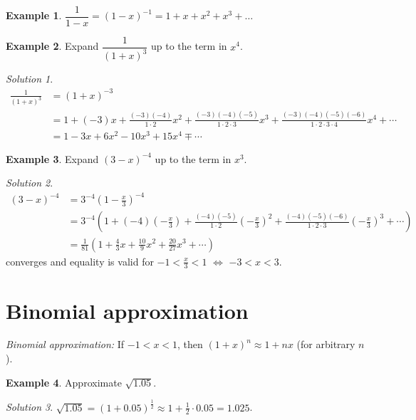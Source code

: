 \documentclass[
  12pt,
  oneside]{book}
\theoremstyle{definition}
\theoremstyle{definition}
\newtheorem{example}{Example}[chapter]
\theoremstyle{definition}
\theoremstyle{definition}
\theoremstyle{remark}
\newtheorem*{solution}{Solution}
\begin{document}
\begin{example}
\(\dfrac{1}{1-x} = (1-x)^{-1} = 1+x+x^2+x^3+\dots\)
\end{example}

\begin{example}
Expand \(\dfrac{1}{(1+x)^3}\) up to the term in \(x^4\).
\end{example}

\begin{solution}
\begin{align*}
\frac{1}{(1+x)^3} &= (1+x)^{-3}\\
&= 1+(-3)x+\frac{(-3)(-4)}{1\cdot 2}x^2 + \frac{(-3)(-4)(-5)}{1\cdot 2\cdot 3}x^3 + \frac{(-3)(-4)(-5)(-6)}{1\cdot 2\cdot 3\cdot 4}x^4 + \cdots\\
&=1-3x+6x^2-10x^3+15x^4 \mp \cdots
\end{align*}
\end{solution}

\begin{example}
Expand \((3-x)^{-4}\) up to the term in \(x^3\).
\end{example}

\begin{solution}
\begin{align*}
(3-x)^{-4} &= 3^{-4}\left(1-\frac{x}{3}\right)^{-4}\\
&= 3^{-4}\left(1+(-4)\left(-\frac{x}{3}\right)
+\frac{(-4)(-5)}{1\cdot 2}\left(-\frac{x}{3}\right)^2 + \frac{(-4)(-5)(-6)}{1\cdot 2\cdot 3}\left(-\frac{x}{3}\right)^3+\cdots\right)\\
&= \frac{1}{81}\left(1+\frac{4}{3}x+\frac{10}{9}x^2+\frac{20}{27}x^3+\cdots\right)
\end{align*}
converges and equality is valid for \(-1<\frac{x}{3}<1\) \(\iff\) \(-3<x<3\).
\end{solution}

\hypertarget{binomial-approximation}{%
\section{Binomial approximation}\label{binomial-approximation}}

\emph{Binomial approximation:} If \(-1<x<1\), then \((1+x)^n \approx 1+nx\) (for arbitrary \(n\)).

\begin{example}
Approximate \(\sqrt{1.05}\).
\end{example}

\begin{solution}
\(\sqrt{1.05} = (1+0.05)^{\frac12} \approx 1+\frac12\cdot0.05 = 1.025\).
\end{solution}
\end{document}

